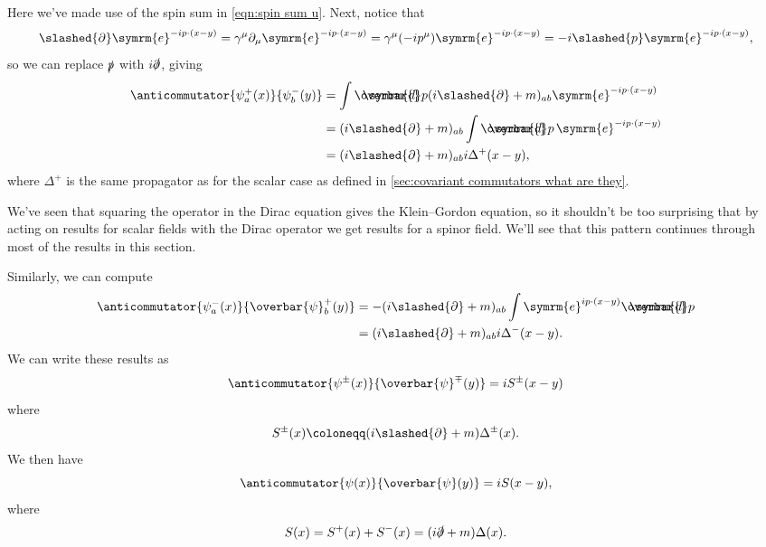 \documentclass[fleqn]{NotesClass}
\newcommand{\e}{\symrm{e}}
\newcommand{\dbar}[1][0.0]{\ThisStyle{\ensurestackMath{%
            \stackengine{#1\LMex}{\SavedStyle \symrm{d}}{\SavedStyle\overbar{}%
                \mkern2.25mu}{O}{r}{F}{F}{L}}}}
\newcommand{\invariantmeasure}[1]{%
    \mathchoice{\dbar #1}{\dbar #1}{\dbar[.05] #1}{\dbar[.06] #1}
}
\newcommand{\diracadjoint}[1]{\overbar{#1}}
\begin{document}
    Here we've made use of the spin sum in \cref{eqn:spin sum u}.
    Next, notice that
    \begin{equation}
        \slashed{\partial} \e^{-ip\cdot (x - y)} = \gamma^\mu \partial_\mu \e^{-ip\cdot (x - y)} = \gamma^\mu(-ip^\mu) \e^{-ip\cdot (x - y)} = -i\slashed{p}\e^{-ip\cdot(x - y)},
    \end{equation}
    so we can replace \(\slashed{p}\) with \(i\slashed{\partial}\), giving
    \begin{align}
        \anticommutator{\psi_a^+(x)}{\psi_b^-(y)} &= \int \invariantmeasure{p} (i\slashed{\partial} + m)_{ab} \e^{-ip\cdot (x - y)}\\
        &= (i\slashed{\partial} + m)_{ab} \int \invariantmeasure{p} \, \e^{-ip\cdot (x - y)}\\
        &= (i\slashed{\partial} + m)_{ab} i \Delta^+(x - y),
    \end{align}
    where \(\Delta^+\) is the same propagator as for the scalar case as defined in \cref{sec:covariant commutators what are they}.
    
    We've seen that squaring the operator in the Dirac equation gives the Klein--Gordon equation, so it shouldn't be too surprising that by acting on results for scalar fields with the Dirac operator we get results for a spinor field.
    We'll see that this pattern continues through most of the results in this section.
    
    Similarly, we can compute
    \begin{align}
        \anticommutator{\psi_a^-(x)}{\diracadjoint{\psi}_b^+(y)} &= -(i\slashed{\partial} + m)_{ab} \int \e^{ip\cdot (x - y)} \invariantmeasure{p}\\
        &= (i\slashed{\partial} + m)_{ab} i\Delta^{-}(x - y).
    \end{align}
    We can write these results as
    \begin{equation}
        \anticommutator{\psi^{\pm}(x)}{\diracadjoint{\psi}^{\mp}(y)} = iS^{\pm}(x - y)
    \end{equation}
    where
    \begin{equation}
        S^{\pm}(x) \coloneqq (i\slashed{\partial} + m) \Delta^{\pm}(x).
    \end{equation}
    We then have
    \begin{equation}
        \anticommutator{\psi(x)}{\diracadjoint{\psi}(y)} = iS(x - y),
    \end{equation}
    where
    \begin{equation}
        S(x) = S^+(x) + S^-(x) = (i\slashed{\partial} + m)\Delta(x).
    \end{equation}
    
\end{document}
